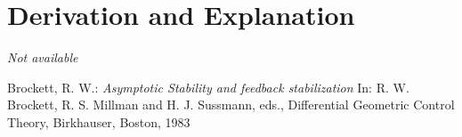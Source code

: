 \documentclass[10pt,a4paper]{article}
\begin{document}
	
	\section{Derivation and Explanation} %
	
	\textit{Not available}
	
	
	\begin{thebibliography}{10}		
		Brockett, R. W.: 
		\textit{Asymptotic Stability and feedback stabilization} In: R. W. Brockett, R. S. 		Millman and H. J. Sussmann, eds., Differential Geometric Control Theory, 					Birkhauser, Boston, 1983
	\end{thebibliography}
\end{document}
